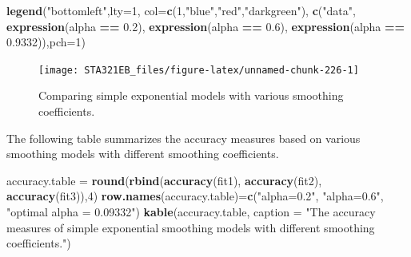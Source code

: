 \documentclass[
]{book}
\newenvironment{Shaded}{\begin{snugshade}}{\end{snugshade}}
\newcommand{\AttributeTok}[1]{\textcolor[rgb]{0.13,0.29,0.53}{#1}}
\newcommand{\DecValTok}[1]{\textcolor[rgb]{0.00,0.00,0.81}{#1}}
\newcommand{\FloatTok}[1]{\textcolor[rgb]{0.00,0.00,0.81}{#1}}
\newcommand{\FunctionTok}[1]{\textcolor[rgb]{0.13,0.29,0.53}{\textbf{#1}}}
\newcommand{\NormalTok}[1]{#1}
\newcommand{\OtherTok}[1]{\textcolor[rgb]{0.56,0.35,0.01}{#1}}
\newcommand{\SpecialCharTok}[1]{\textcolor[rgb]{0.81,0.36,0.00}{\textbf{#1}}}
\newcommand{\StringTok}[1]{\textcolor[rgb]{0.31,0.60,0.02}{#1}}
\begin{document}
\begin{Shaded}
\begin{Highlighting}[]
\FunctionTok{legend}\NormalTok{(}\StringTok{"bottomleft"}\NormalTok{,}\AttributeTok{lty=}\DecValTok{1}\NormalTok{, }\AttributeTok{col=}\FunctionTok{c}\NormalTok{(}\DecValTok{1}\NormalTok{,}\StringTok{"blue"}\NormalTok{,}\StringTok{"red"}\NormalTok{,}\StringTok{"darkgreen"}\NormalTok{),}
  \FunctionTok{c}\NormalTok{(}\StringTok{"data"}\NormalTok{, }\FunctionTok{expression}\NormalTok{(alpha }\SpecialCharTok{==} \FloatTok{0.2}\NormalTok{), }\FunctionTok{expression}\NormalTok{(alpha }\SpecialCharTok{==} \FloatTok{0.6}\NormalTok{),}
  \FunctionTok{expression}\NormalTok{(alpha }\SpecialCharTok{==}  \FloatTok{0.9332}\NormalTok{)),}\AttributeTok{pch=}\DecValTok{1}\NormalTok{)}
\end{Highlighting}
\end{Shaded}

\begin{figure}

{\centering \texttt{[image: STA321EB\_files/figure-latex/unnamed-chunk-226-1]} 

}

\caption{Comparing simple exponential models with various smoothing coefficients.}\label{fig:unnamed-chunk-226}
\end{figure}

The following table summarizes the accuracy measures based on various smoothing models with different smoothing coefficients.

\begin{Shaded}
\begin{Highlighting}[]
\NormalTok{accuracy.table }\OtherTok{=} \FunctionTok{round}\NormalTok{(}\FunctionTok{rbind}\NormalTok{(}\FunctionTok{accuracy}\NormalTok{(fit1), }\FunctionTok{accuracy}\NormalTok{(fit2), }\FunctionTok{accuracy}\NormalTok{(fit3)),}\DecValTok{4}\NormalTok{)}
\FunctionTok{row.names}\NormalTok{(accuracy.table)}\OtherTok{=}\FunctionTok{c}\NormalTok{(}\StringTok{"alpha=0.2"}\NormalTok{, }\StringTok{"alpha=0.6"}\NormalTok{, }\StringTok{"optimal alpha = 0.09332"}\NormalTok{)}
\FunctionTok{kable}\NormalTok{(accuracy.table, }\AttributeTok{caption =} \StringTok{"The accuracy measures of simple exponential }
\StringTok{      smoothing models with different smoothing coefficients."}\NormalTok{)}
\end{Highlighting}
\end{Shaded}
\end{document}

